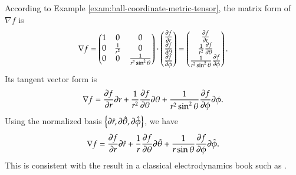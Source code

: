 \documentclass[11pt, a4paper]{book}
\begin{document}
\begin{Example}
  \label{exam:ball-coordinate-gradient}
  According to Example \ref{exam:ball-coordinate-metric-tensor}, the matrix form of
  $\nabla f$ is
  \begin{equation}
    \nabla f = \begin{pmatrix}
      1 & 0 & 0\\
      0 & \frac{1}{r^2} & 0 \\
      0 & 0 & \frac{1}{r^2\sin^2\theta}
    \end{pmatrix}
    \cdot
    \begin{pmatrix}
      \frac{\partial f}{\partial r} \\
      \frac{\partial f}{\partial \theta} \\
      \frac{\partial f}{\partial \phi}
    \end{pmatrix} = \begin{pmatrix}
      \frac{\partial f}{\partial r} \\
      \frac{1}{r^2} \frac{\partial f}{\partial \theta} \\
      \frac{1}{r^2\sin^2\theta} \frac{\partial f}{\partial \phi}
    \end{pmatrix}.
  \end{equation}
  Its tangent vector form is
  \begin{equation}
    \nabla f = \frac{\partial f}{\partial r}\boldsymbol{\partial}r + \frac{1}{r^2} \frac{\partial
      f}{\partial \theta} \boldsymbol{\partial}\theta + \frac{1}{r^2\sin^2\theta} \frac{\partial
      f}{\partial \phi} \boldsymbol{\partial}\phi.
  \end{equation}
  Using the normalized basis
  $\left\{ \boldsymbol{\partial}\hat{r}, \boldsymbol{\partial}\hat{\theta}, \boldsymbol{\partial}\hat{\phi}
  \right\}$, we have
  \begin{equation}
    \nabla f = \frac{\partial f}{\partial r}\boldsymbol{\partial}\hat{r} + \frac{1}{r} \frac{\partial
      f}{\partial \theta} \boldsymbol{\partial}\hat{\theta} + \frac{1}{r\sin\theta} \frac{\partial
      f}{\partial \phi} \boldsymbol{\partial}\hat{\phi}.
  \end{equation}
  This is consistent with the result in a classical electrodynamics book such as
  \citep{GriffithsIntroduction1999}.
\end{Example}
\end{document}
